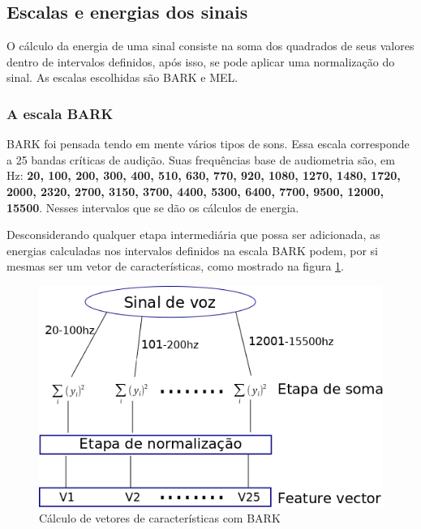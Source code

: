 \begin{myenv}{1.5}
	\subsection{Escalas e energias dos sinais}
		\par O cálculo da energia de uma sinal consiste na soma dos quadrados de seus valores dentro de intervalos definidos, após  isso, se pode aplicar uma normalização do sinal. As escalas escolhidas são BARK e MEL.
		\subsubsection{A escala BARK}
			\par BARK foi pensada tendo em mente vários tipos de sons. Essa escala corresponde a 25 bandas críticas de audição. Suas frequências base de audiometria são, em Hz: \textbf{20, 100, 200, 300, 400, 510, 630, 770, 920, 1080, 1270, 1480, 1720, 2000, 2320, 2700, 3150, 3700, 4400, 5300, 6400, 7700, 9500, 12000, 15500}. Nesses intervalos que se dão os cálculos de energia.
			\par Desconsiderando qualquer etapa intermediária que possa ser adicionada, as energias calculadas nos intervalos definidos na escala BARK podem, por si mesmas ser um vetor de características, como mostrado na figura \ref{fig:barkfeaturevect}.
			\begin{figure}[h]
				\centering
				\includegraphics[width=0.6\linewidth]{images/barkFeatureVect}
				\caption{Cálculo de vetores de características com BARK}
				\label{fig:barkfeaturevect}
			\end{figure}

\end{myenv}
